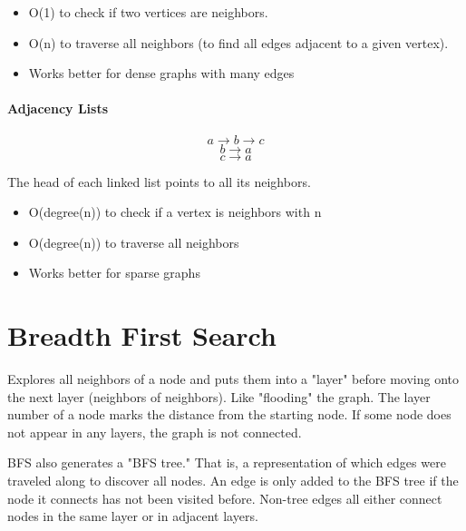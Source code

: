\begin{itemize}
    \item O(1) to check if two vertices are neighbors.
    \item O(n) to traverse all neighbors (to find all edges adjacent to a given vertex).
    \item Works better for dense graphs with many edges
\end{itemize}


\paragraph{Adjacency Lists}

\[a \rightarrow b \rightarrow c\]
\[b \rightarrow a \]
\[c \rightarrow a\]

The head of each linked list points to all its neighbors.

\begin{itemize}
    \item O(degree(n)) to check if a vertex is neighbors with n
    \item O(degree(n)) to traverse all neighbors
    \item Works better for sparse graphs
\end{itemize}

\section{Breadth First Search}
Explores all neighbors of a node and puts them into a "layer" before moving onto the next layer (neighbors of neighbors). Like "flooding" the graph. The layer number of a node marks the distance from the starting node. If some node does not appear in any layers, the graph is not connected.

BFS also generates a "BFS tree." That is, a representation of which edges were traveled along to discover all nodes. An edge is only added to the BFS tree if the node it connects has not been visited before. Non-tree edges all either connect nodes in the same layer or in adjacent layers.

